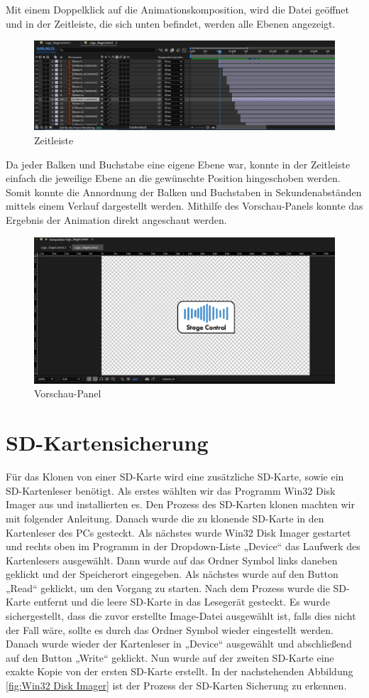 Mit einem Doppelklick auf die Animationskomposition, wird die Datei geöffnet und in der Zeitleiste, die sich unten befindet, werden alle Ebenen angezeigt. 

 \begin{figure}[H]
	\centering
	\includegraphics[width=0.5\linewidth]{images/Zeitleiste.png}
	\caption[Zeitleiste]{Zeitleiste}
	\label{fig:Zeitleiste}
\end{figure} 

Da jeder Balken und Buchstabe eine eigene Ebene war, konnte in der Zeitleiste einfach die jeweilige Ebene an die gewünschte Position hingeschoben werden. Somit konnte die Annordnung der Balken und Buchstaben in Sekundenabständen mittels einem Verlauf dargestellt werden. Mithilfe des Vorschau-Panels konnte das Ergebnis der Animation direkt angeschaut werden. 

 \begin{figure}[H]
	\centering
	\includegraphics[width=0.5\linewidth]{images/Vorschau-Panel.png}
	\caption[Vorschau-Panel]{Vorschau-Panel}
	\label{fig:Vorschau-Panel}
\end{figure} 

\section{SD-Kartensicherung}
Für das Klonen von einer SD-Karte wird eine zusätzliche SD-Karte, sowie ein SD-Kartenleser benötigt. Als erstes wählten wir das Programm Win32 Disk Imager aus und installierten es. Den Prozess des SD-Karten klonen machten wir mit folgender Anleitung. \parencite{SD-Kartenklonen}
Danach wurde die zu klonende SD-Karte in den Kartenleser des PCs gesteckt. Als nächstes wurde Win32 Disk Imager gestartet und rechts oben im Programm in der Dropdown-Liste „Device“ das Laufwerk des Kartenlesers ausgewählt. Dann wurde auf das Ordner Symbol links daneben geklickt und der Speicherort eingegeben. Als nächstes wurde auf den Button „Read“ geklickt, um den Vorgang zu starten. Nach dem Prozess wurde die SD-Karte entfernt und die leere SD-Karte in das Lesegerät gesteckt. Es wurde sichergestellt, dass die zuvor erstellte Image-Datei ausgewählt ist, falls dies nicht der Fall wäre, sollte es durch das Ordner Symbol wieder eingestellt werden. Danach wurde wieder der Kartenleser in „Device“ ausgewählt und abschließend auf den Button „Write“ geklickt. Nun wurde auf der zweiten SD-Karte eine exakte Kopie von der ersten SD-Karte erstellt. In der nachstehenden Abbildung \ref{fig:Win32 Disk Imager} ist der Prozess der SD-Karten Sicherung zu erkennen.

